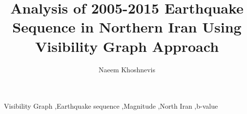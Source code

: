 \documentclass[a4paper,review]{elsarticle}
\begin{document}
\begin{frontmatter}

\title{Analysis of 2005-2015 Earthquake Sequence in Northern Iran Using Visibility Graph Approach}

\author[label1]{Naeem Khoshnevis}




\begin{keyword}
Visibility Graph \sep Earthquake sequence \sep Magnitude \sep North Iran \sep b-value 



\end{keyword}

\end{frontmatter}















\end{document}
